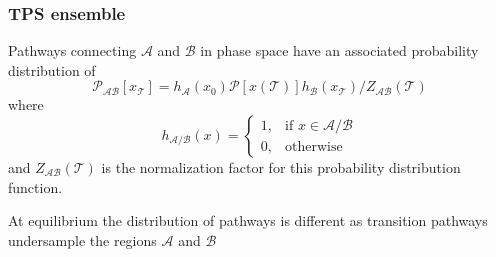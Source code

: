 \documentclass{beamer}
\begin{document}
\begin{frame}
\frametitle{TPS ensemble}
Pathways connecting $\mathcal{A}$ and $\mathcal{B}$ in phase space have an associated probability distribution of
\begin{equation}
\mathcal{P}_{\mathcal{AB}}[x_{\mathcal{T}}] = h_{\mathcal{A}}(x_0)\mathcal{P}[x(\mathcal{T})]
h_{\mathcal{B}}(x_{\mathcal{T}})/Z_{\mathcal{AB}}(\mathcal{T})\label{eqn:tpsensem}\nonumber 
\end{equation}
where 
\[
    h_{\mathcal{A}/\mathcal{B}}(x)= 
\begin{cases}
    1, & \text{if } x\in \mathcal{A}/\mathcal{B}\\
    0,              & \text{otherwise}
\end{cases}
\]
and $Z_{\mathcal{AB}}(\mathcal{T})$ is the normalization factor for this 
probability distribution function.
\begin{block}{}
At equilibrium the distribution of pathways is different as transition pathways undersample the 
regions $\mathcal{A}$ and $\mathcal{B}$
\end{block}
\end{frame}
%
\end{document}
